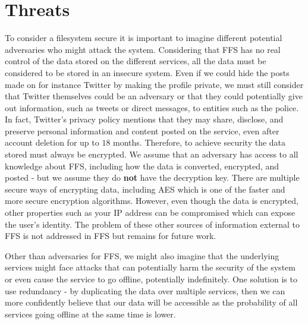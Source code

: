 \section{Threats}
To consider a filesystem secure it is important to imagine different potential adversaries who might attack the system. Considering that FFS has no real control of the data stored on the different services, all the data must be considered to be stored in an insecure system. Even if we could hide the posts made on for instance Twitter by making the profile private, we must still consider that Twitter themselves could be an adversary or that they could potentially give out information, such as tweets or direct messages, to entities such as the police. In fact, Twitter's privacy policy mentions that they may share, disclose, and preserve personal information and content posted on the service, even after account deletion for up to $18$ months\cite{TwitterPrivacyPolicy}. Therefore, to achieve security the data stored must always be encrypted. We assume that an adversary has access to all knowledge about FFS, including how the data is converted, encrypted, and posted - but we assume they do \textbf{not} have the decryption key. There are multiple secure ways of encrypting data, including AES which is one of the faster and more secure encryption algorithms\cite{mahajanStudyEncryptionAlgorithms2013}. However, even though the data is encrypted, other properties such as your IP address can be compromised which can expose the user's identity. The problem of these other sources of information external to FFS is not addressed in FFS but remains for future work.

Other than adversaries for FFS, we might also imagine that the underlying services might face attacks that can potentially harm the security of the system or even cause the service to go offline, potentially indefinitely. One solution is to use redundancy - by duplicating the data over multiple services, then we can more confidently believe that our data will be accessible as the probability of all services going offline at the same time is lower.